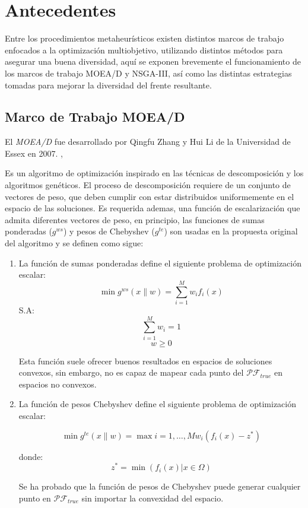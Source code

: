 \documentclass[letterpaper,10pt]{article}
\begin{document}
\section{Antecedentes}

Entre los procedimientos metaheurísticos existen distintos marcos de trabajo enfocados a la optimización multiobjetivo, utilizando distintos métodos para asegurar una buena diversidad,
aquí se exponen brevemente el funcionamiento de los marcos de trabajo MOEA/D y NSGA-III, así como las distintas estrategias tomadas para mejorar la diversidad del frente resultante.

\subsection{Marco de Trabajo MOEA/D}
El \emph{MOEA/D} fue desarrollado por Qingfu Zhang y Hui Li de la Universidad de Essex en 2007. \cite{4358754}, 

Es un algoritmo de optimización inspirado en las técnicas de descomposición y los algoritmos genéticos. El proceso de descomposición requiere de un conjunto de vectores de peso, 
que deben cumplir con estar distribuidos uniformemente en el espacio de las soluciones. Es requerida ademas, una función de escalarización que admita diferentes vectores de peso, en principio, 
las funciones de sumas ponderadas  ($g^{ws}$) y pesos de Chebyshev ($g^{te}$) son usadas en la propuesta original del algoritmo y se definen como sigue:

\begin{enumerate}
\item La función de sumas ponderadas define el siguiente problema de optimización escalar:
$$\min g^{ws}(x\|w) = \sum^M_{i=1} w_if_i(x) $$
S.A:
$$ \sum^M_{i=1} w_i = 1$$
$$w \geq 0$$ 

Esta función suele ofrecer buenos resultados en espacios de soluciones convexos, sin embargo, no es capaz de mapear cada punto del $\mathcal{PF}_{true}$ en espacios no convexos.

\item La función de pesos Chebyshev define el siguiente problema de optimización escalar:

$$\min g^{te}(x\|w) = \max{i=1,\dots,M} w_i(f_i(x) -z^{*})$$

donde:
$$z^{*}= \min (f_i(x) | x \in \Omega) $$

Se ha probado que la función de pesos de Chebyshev puede generar cualquier punto en $\mathcal{PF}_{true}$ sin importar la convexidad del espacio.
\end{enumerate}
\end{document}
